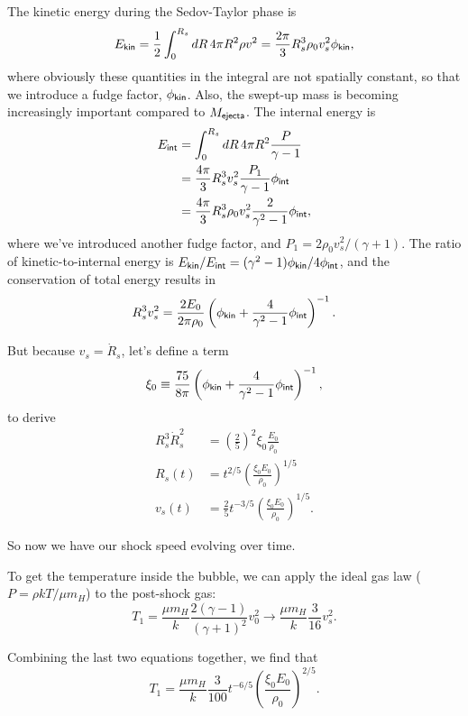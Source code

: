 \documentclass{tufte-handout}
\renewcommand{\rm}{\sf}
\begin{document}
\begin{enumerate}
The kinetic energy during the Sedov-Taylor phase is
\begin{equation}
E_{\rm kin} = \frac{1}{2}\int_0^{R_s}dR\, 4\pi R^2 \rho v^2 = \frac{2\pi}{3} R_s^3 \rho_0 v_s^2 \phi_{\rm kin},
\end{equation}
where obviously these quantities in the integral are not spatially constant, so that we introduce a fudge factor, $\phi_{\rm kin}$. Also, the swept-up mass is becoming increasingly important compared to $M_{\rm ejecta}$.
The internal energy is
\begin{align}
E_{\rm int} &= \int_0^{R_s} dR\, 4\pi R^2 \frac{P}{\gamma - 1}\nonumber \\
&= \frac{4\pi}{3} R_s^3 v_s^2 \frac{P_1}{\gamma - 1} \phi_{\rm int} \nonumber \\
&= \frac{4\pi}{3}R_s^3 \rho_0 v_s^2 \frac{2}{\gamma^2 - 1}\phi_{\rm int},
\end{align}
where we've introduced another fudge factor, and $P_1 = 2\rho_0 v_s^2 / (\gamma + 1)$. The ratio of kinetic-to-internal energy is $E_{\rm kin}/E_{\rm int} = (\gamma^2-1)\phi_{\rm kin}/4\phi_{\rm int}$, and the conservation of total energy results in
\[R_s^3 v_s^2 = \frac{2E_0}{2\pi \rho_0 }\left (\phi_{\rm kin} + \frac{4}{\gamma^2 - 1}\phi_{\rm int}\right )^{-1}.\]

But because $v_s = \dot R_s$, let's define a term
\[\xi_0 \equiv \frac{75}{8\pi}\left (\phi_{\rm kin} + \frac{4}{\gamma^2 - 1}\phi_{\rm int}\right )^{-1},\]
to derive
\begin{align}
R_s^3 \dot R_s^2 &= \left (\frac{2}{5}\right )^2 \xi_0 \frac{E_0}{\rho_0} \nonumber \\
R_s(t) &= t^{2/5} \left (\frac{\xi_0 E_0}{\rho_0}\right )^{1/5}\\
v_s(t) &= \frac{2}{5}t^{-3/5}\left (\frac{\xi_0 E_0}{\rho_0}\right )^{1/5}.
\end{align}

So now we have our shock speed evolving over time.

To get the temperature inside the bubble, we can apply the ideal gas law ($P = \rho k T/ \mu m_H$) to the post-shock gas:
\begin{equation}
T_1 = \frac{\mu m_H}{k}\frac{2(\gamma-1)}{(\gamma+1)^2}v_0^2 \rightarrow \frac{\mu m_H}{k}\frac{3}{16} v_s^2.
\end{equation}

Combining the last two equations together, we find that
\begin{equation}
T_1 = \frac{\mu m_H}{k}\frac{3}{100} t^{-6/5} \left (\frac{\xi_0 E_0}{\rho_0}\right )^{2/5}.
\end{equation}


\end{enumerate}
\end{document}
